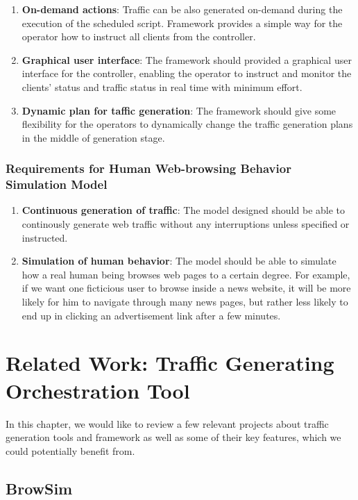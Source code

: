 \documentclass[12pt]{report}
\begin{document}
\begin{enumerate}
\item \textbf{On-demand actions}: Traffic can be also generated on-demand during the execution of the scheduled script. Framework provides a simple way for the operator how to instruct all clients from the controller.
\item \textbf{Graphical user interface}: The framework should provided a graphical user interface for the controller, enabling the operator to instruct and monitor the clients’ status and traffic status in real time with minimum effort.
\item \textbf{Dynamic plan for taffic generation}: The framework should give some flexibility for the operators to dynamically change the traffic generation plans in the middle of generation stage.
\end{enumerate}

\subsection{Requirements for Human Web-browsing Behavior Simulation Model}
\begin{enumerate}
\item \textbf{Continuous generation of traffic}: The model designed should be able to continously generate web traffic without any interruptions unless specified or instructed. 
\item \textbf{Simulation of human behavior}: The model should be able to simulate how a real human being browses web pages to a certain degree. For example, if we want one ficticious user to browse inside a news website, it will be more likely for him to navigate through many news pages, but rather less likely to end up in clicking an advertisement link after a few minutes.

\end{enumerate}

\chapter{Related Work: Traffic Generating Orchestration Tool} \label{rw:tfo}
In this chapter, we would like to review a few relevant projects about traffic generation tools and framework as well as some of their key features, which we could potentially benefit from.

\section{BrowSim}
\end{document}
